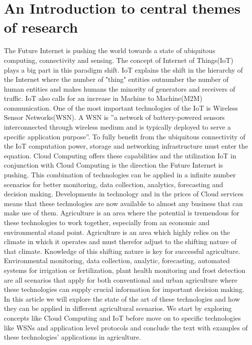 \documentclass[]{uiophd}
\begin{document}
\section{An Introduction to central themes of research}
The Future Internet is pushing the world towards a state of ubiquitous computing, connectivity and sensing. The concept of Internet of Things(IoT) plays a big part in this paradigm shift. IoT explains the shift in the hierarchy of the Internet where the number of "thing" entities outnumber the number of human entities and makes humans the minority of generators and receivers of traffic. IoT also calls for an increase in Machine to Machine(M2M) communication. One of the most important technologies of the IoT is Wireless Sensor Networks(WSN). A WSN is ''a network of battery-powered sensors interconnected through wireless medium and is typically deployed to serve a specific application purpose''\cite{Ojha2015662}. To fully benefit from the ubiquitous connectivity of the IoT computation power, storage and networking infrastructure must enter the equation. Cloud Computing offers these capabilities and the utilization IoT in conjunction with Cloud Computing is the direction the Future Internet is pushing. This combination of technologies can be applied in a infinite number scenarios for better monitoring, data collection, analytics, forecasting and decision making. Developments in technology and in the prices of Cloud services means that these technologies are now available to almost any business that can make use of them. Agriculture is an area where the potential is tremendous for these technologies to work together, especially from an economic and environmental stand point. Agriculture is an area which highly relies on the climate in which it operates and must therefor adjust to the shifting nature of that climate. Knowledge of this shifting nature is key for successful agriculture. Environmental monitoring, data collection, analytic, forecasting, automated systems for irrigation or fertilization, plant health monitoring and frost detection are all scenarios that apply for both conventional and urban agriculture where these technologies can supply crucial information for important decision making. In this article we will explore the state of the art of these technologies and how they can be applied in different agricultural scenarios. We start by exploring concepts like Cloud Computing and IoT before move on to specific technologies like WSNs and application level protocols and conclude the text with examples of these technologies' applications in agriculture.
\end{document}
